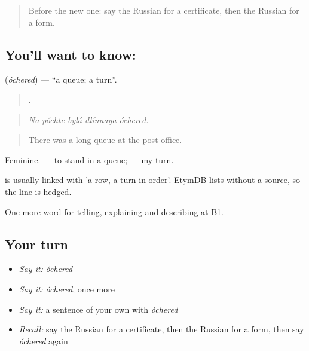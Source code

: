 \label{lesson:RU-C450-ochered}



\begin{quote}
Before the new one: say the Russian for a certificate, then the Russian for a form.
\end{quote}

\subsection*{You'll want to know: }
\textbf{} (\emph{óchered}) — \textquotedblleft{}a queue; a turn\textquotedblright{}.

\begin{quote}
    .
\end{quote}

\begin{quote}
\emph{Na póchte bylá dlínnaya óchered.}
\end{quote}

\begin{quote}
There was a long queue at the post office.
\end{quote}

Feminine. \emph{  } — to stand in a queue; \emph{ } — my turn.

\begin{cousinweb}
\emph{} is usually linked with \emph{} 'a row, a turn in order'. EtymDB lists \emph{} without a source, so the line is hedged.
\end{cousinweb}

\begin{grammarlens}[title={What you've built}]
One more word for telling, explaining and describing at B1.
\end{grammarlens}

\subsection*{Your turn}
\begin{itemize}
\raggedright
  \item \emph{Say it:} \emph{óchered}
  \item \emph{Say it:} \emph{óchered}, once more
  \item \emph{Say it:} a sentence of your own with \emph{óchered}
  \item \emph{Recall:} say the Russian for a certificate, then the Russian for a form, then say \emph{óchered} again
\end{itemize}

